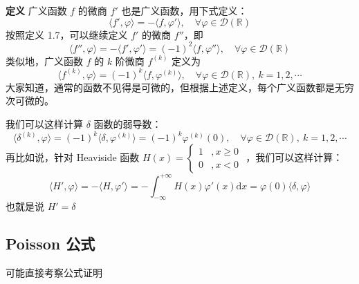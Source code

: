 \documentclass[12pt,a4paper]{ctexart}
\begin{document}
	\noindent\textbf{定义} \quad 广义函数 $f$ 的微商 $f'$ 也是广义函数，用下式定义：
	\begin{equation}
		\langle f', \varphi \rangle = - \langle f, \varphi' \rangle, \quad \forall \varphi \in \mathscr{D}(\mathbb{R})
	\end{equation}
	按照定义 1.7，可以继续定义 $f'$ 的微商 $f''$，即
	\[
	\langle f'', \varphi \rangle = - \langle f', \varphi' \rangle = (-1)^2 \langle f, \varphi'' \rangle, \quad \forall \varphi \in \mathscr{D}(\mathbb{R})
	\]
	类似地，广义函数 $f$ 的 $k$ 阶微商 $f^{(k)}$ 定义为
	\begin{equation}
		\langle f^{(k)}, \varphi \rangle = (-1)^k \langle f, \varphi^{(k)} \rangle, \quad \forall \varphi \in \mathscr{D}(\mathbb{R}), \ k=1,2,\cdots
	\end{equation}
	大家知道，通常的函数不见得是可微的，但根据上述定义，每个广义函数都是无穷次可微的。
	
	\noindent 我们可以这样计算 $\delta$ 函数的弱导数：
	\[
	\langle \delta^{(k)}, \varphi \rangle = (-1)^k \langle \delta, \varphi^{(k)} \rangle = (-1)^k \varphi^{(k)}(0), \quad \forall \varphi \in \mathscr{D}(\mathbb{R}), \ k=1,2,\cdots
	\]
	再比如说，针对 Heaviside 函数 $H(x) = \begin{cases} 1 & , x \geqslant 0 \\ 0 & , x < 0 \end{cases}$ ，我们可以这样计算：
	\[
	\langle H', \varphi \rangle = - \langle H, \varphi' \rangle = - \int_{-\infty}^{+\infty} H(x)\varphi'(x)\mathrm{d}x = \varphi(0)\langle \delta, \varphi \rangle
	\]
	也就是说 $H' = \delta$
	
	\subsection{Poisson 公式}
	
	可能直接考察公式证明
	
\end{document}
